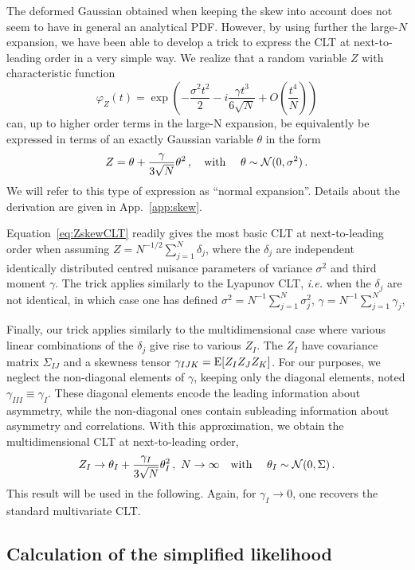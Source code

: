 \documentclass[11pt]{article}
\newcommand{\be}{\begin{equation}}
\newcommand{\ee}{\end{equation}}
\begin{document}
The deformed Gaussian obtained when keeping the skew into account does not seem to have in general an analytical PDF. However, by using further the large-$N$  expansion, we have been able to develop a  trick to express the CLT at next-to-leading order in a very simple way. We realize that a random variable $Z$ with characteristic function
\be
\varphi_Z(t)=\exp\left(-\frac{\sigma^2 t^2}{2}-i \frac{\gamma t^3}{6 \sqrt{N}} +O\left(\frac{t^4}{N}\right)\right) \label{eq:CF_CLT}
 \ee
can, up to higher order terms in the large-N expansion, be equivalently be expressed in terms of an exactly Gaussian variable $\theta$ in the form
\be
Z= \theta+\frac{\gamma}{3\sqrt{N}}\theta^2\,,  \quad \textrm{with } \quad \theta\sim{\cal N}(0,\sigma^2)\,. \label{eq:ZskewCLT}
\ee
We will refer to this type of expression as ``normal expansion''. Details about the derivation are given in App.~\ref{app:skew}.


Equation~\eqref{eq:ZskewCLT}  readily gives the most basic CLT at next-to-leading order when assuming $Z=N^{-1/2}\sum_{j=1}^N \delta_j$, where the $\delta_j$ are  independent identically distributed centred nuisance parameters  of variance $\sigma^2$ and third moment $\gamma$. The trick applies similarly to the Lyapunov CLT, \textit{i.e.} when the $\delta_j$ are not identical, in which case one has defined $\sigma^2=N^{-1}\sum_{j=1}^N \sigma_j^2$, $\gamma=N^{-1}\sum_{j=1}^N \gamma_j$,

Finally, our trick applies similarly to the multidimensional case where various linear combinations of the $\delta_j$ give rise to various $Z_I$. The $Z_I$ have covariance matrix $\Sigma_{IJ}$ and a skewness tensor $\gamma_{IJK}={\rm E}[Z_IZ_JZ_K]$. For our purposes, we neglect the non-diagonal elements of $\gamma$, keeping only  the diagonal elements, noted $\gamma_{III}\equiv \gamma_I$. These diagonal elements encode the leading information about asymmetry, while the non-diagonal ones contain subleading information about asymmetry and correlations. With this approximation, we obtain the multidimensional CLT at next-to-leading order,
\be
Z_I\rightarrow \theta_I+\frac{\gamma_{I}}{3\sqrt{N}}\theta_I^2\,,\,\,N\rightarrow \infty  \quad \textrm{with } \quad \theta_I\sim{\cal N}(0,\Sigma)\,. \label{eq:NLCFT}
\ee
 This  result will be used in the following. Again, for $\gamma_I\rightarrow 0$, one recovers the standard multivariate CLT.





\subsection{Calculation of the simplified likelihood}
\label{se:analytic}
\end{document}
